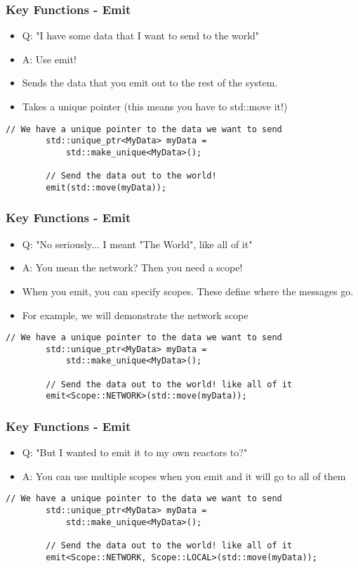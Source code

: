 \documentclass{beamer}
\begin{document}
\begin{frame}[fragile]
	\frametitle{Key Functions - Emit}
	\begin{itemize}
		\item Q: "I have some data that I want to send to the world"
		\item A: Use emit!
		\item Sends the data that you emit out to the rest of the system.
		\item Takes a unique pointer (this means you have to std::move it!)
	\end{itemize}

	\begin{lstlisting}[language=nuclear]
		// We have a unique pointer to the data we want to send
		std::unique_ptr<MyData> myData =
		    std::make_unique<MyData>();

		// Send the data out to the world!
		emit(std::move(myData));
	\end{lstlisting}
\end{frame}

\begin{frame}[fragile]
	\frametitle{Key Functions - Emit}
	\begin{itemize}
		\item Q: "No seriously... I meant "The World", like all of it"
		\item A: You mean the network? Then you need a scope!
		\item When you emit, you can specify scopes. These define where the messages go.
		\item For example, we will demonstrate the network scope
	\end{itemize}

	\begin{lstlisting}[language=nuclear]
		// We have a unique pointer to the data we want to send
		std::unique_ptr<MyData> myData =
		    std::make_unique<MyData>();

		// Send the data out to the world! like all of it
		emit<Scope::NETWORK>(std::move(myData));
	\end{lstlisting}
\end{frame}

\begin{frame}[fragile]
	\frametitle{Key Functions - Emit}
	\begin{itemize}
		\item Q: "But I wanted to emit it to my own reactors to?"
		\item A: You can use multiple scopes when you emit and it will go to all of them
	\end{itemize}

	\begin{lstlisting}[language=nuclear]
		// We have a unique pointer to the data we want to send
		std::unique_ptr<MyData> myData =
		    std::make_unique<MyData>();

		// Send the data out to the world! like all of it
		emit<Scope::NETWORK, Scope::LOCAL>(std::move(myData));
	\end{lstlisting}
\end{frame}
\end{document}
